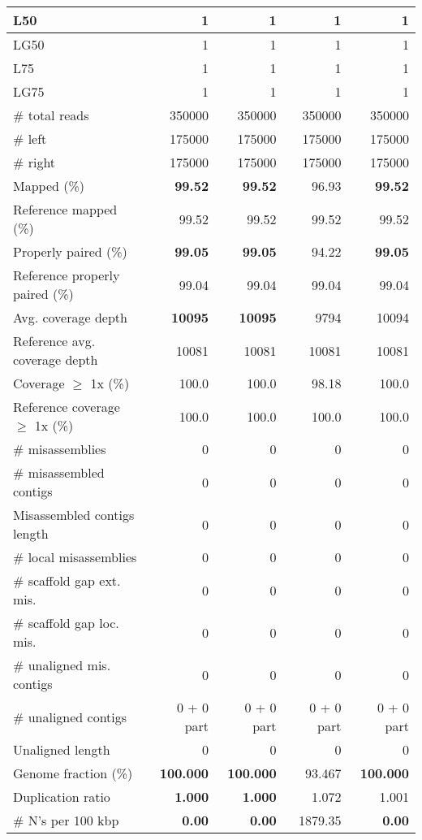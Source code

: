 \documentclass[12pt,a4paper]{article}
\begin{document}
\begin{table}[ht]
\begin{center}
\begin{tabular}{|l*{4}{|r}|}
L50 & 1 & 1 & 1 & 1 \\ \hline
LG50 & 1 & 1 & 1 & 1 \\ \hline
L75 & 1 & 1 & 1 & 1 \\ \hline
LG75 & 1 & 1 & 1 & 1 \\ \hline
\# total reads & 350000 & 350000 & 350000 & 350000 \\ \hline
\# left & 175000 & 175000 & 175000 & 175000 \\ \hline
\# right & 175000 & 175000 & 175000 & 175000 \\ \hline
Mapped (\%) & {\bf 99.52} & {\bf 99.52} & 96.93 & {\bf 99.52} \\ \hline
Reference mapped (\%) & 99.52 & 99.52 & 99.52 & 99.52 \\ \hline
Properly paired (\%) & {\bf 99.05} & {\bf 99.05} & 94.22 & {\bf 99.05} \\ \hline
Reference properly paired (\%) & 99.04 & 99.04 & 99.04 & 99.04 \\ \hline
Avg. coverage depth & {\bf 10095} & {\bf 10095} & 9794 & 10094 \\ \hline
Reference avg. coverage depth & 10081 & 10081 & 10081 & 10081 \\ \hline
Coverage $\geq$ 1x (\%) & 100.0 & 100.0 & 98.18 & 100.0 \\ \hline
Reference coverage $\geq$ 1x (\%) & 100.0 & 100.0 & 100.0 & 100.0 \\ \hline
\# misassemblies & 0 & 0 & 0 & 0 \\ \hline
\# misassembled contigs & 0 & 0 & 0 & 0 \\ \hline
Misassembled contigs length & 0 & 0 & 0 & 0 \\ \hline
\# local misassemblies & 0 & 0 & 0 & 0 \\ \hline
\# scaffold gap ext. mis. & 0 & 0 & 0 & 0 \\ \hline
\# scaffold gap loc. mis. & 0 & 0 & 0 & 0 \\ \hline
\# unaligned mis. contigs & 0 & 0 & 0 & 0 \\ \hline
\# unaligned contigs & 0 + 0 part & 0 + 0 part & 0 + 0 part & 0 + 0 part \\ \hline
Unaligned length & 0 & 0 & 0 & 0 \\ \hline
Genome fraction (\%) & {\bf 100.000} & {\bf 100.000} & 93.467 & {\bf 100.000} \\ \hline
Duplication ratio & {\bf 1.000} & {\bf 1.000} & 1.072 & 1.001 \\ \hline
\# N's per 100 kbp & {\bf 0.00} & {\bf 0.00} & 1879.35 & {\bf 0.00} \\ \hline

\end{tabular}
\end{center}
\end{table}
\end{document}
